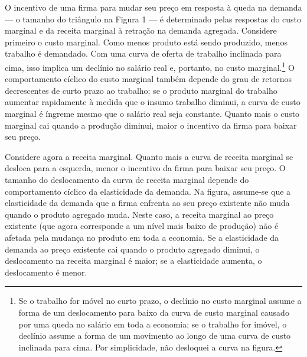 \documentclass[12pt]{article}
\begin{document}
O incentivo de uma firma para mudar seu preço em resposta à queda na demanda — o tamanho do triângulo na Figura 1 — é determinado pelas respostas do custo marginal e da receita marginal à retração na demanda agregada. Considere primeiro o custo marginal. Como menos produto está sendo produzido, menos trabalho é demandado. Com uma curva de oferta de trabalho inclinada para cima, isso implica um declínio no salário real e, portanto, no custo marginal.\footnote{Se o trabalho for móvel no curto prazo, o declínio no custo marginal assume a forma de um deslocamento para baixo da curva de custo marginal causado por uma queda no salário em toda a economia; se o trabalho for imóvel, o declínio assume a forma de um movimento ao longo de uma curva de custo inclinada para cima. Por simplicidade, não desloquei a curva na figura.} O comportamento cíclico do custo marginal também depende do grau de retornos decrescentes de curto prazo ao trabalho; se o produto marginal do trabalho aumentar rapidamente à medida que o insumo trabalho diminui, a curva de custo marginal é íngreme mesmo que o salário real seja constante. Quanto mais o custo marginal cai quando a produção diminui, maior o incentivo da firma para baixar seu preço.

Considere agora a receita marginal. Quanto mais a curva de receita marginal se desloca para a esquerda, menor o incentivo da firma para baixar seu preço. O tamanho do deslocamento da curva de receita marginal depende do comportamento cíclico da elasticidade da demanda. Na figura, assume-se que a elasticidade da demanda que a firma enfrenta ao seu preço existente não muda quando o produto agregado muda. Neste caso, a receita marginal ao preço existente (que agora corresponde a um nível mais baixo de produção) não é afetada pela mudança no produto em toda a economia. Se a elasticidade da demanda ao preço existente cai quando o produto agregado diminui, o deslocamento na receita marginal é maior; se a elasticidade aumenta, o deslocamento é menor.
\end{document}
